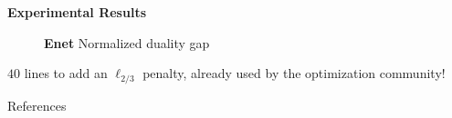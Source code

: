 \documentclass[english,final,t]{beamer}
\begin{document}
\begin{frame}{}
\begin{columns}[t]
\begin{column}{.3\linewidth}
\begin{block}{\textbf{\color{malgared}Experimental Results}}
\begin{figure}[tb]
					\textbf{Enet} Normalized duality gap
			\end{figure}
			\vspace{1.5em}
			$40$ lines to add an $\ell_{2/3}$ penalty, {\color{malgared}already used by the optimization community!}
			\begin{center}
			\end{center}
			References
			\nocite{*}
			\normalsize
	\end{block}

	\end{column}
\end{columns}
\end{frame}
\end{document}
